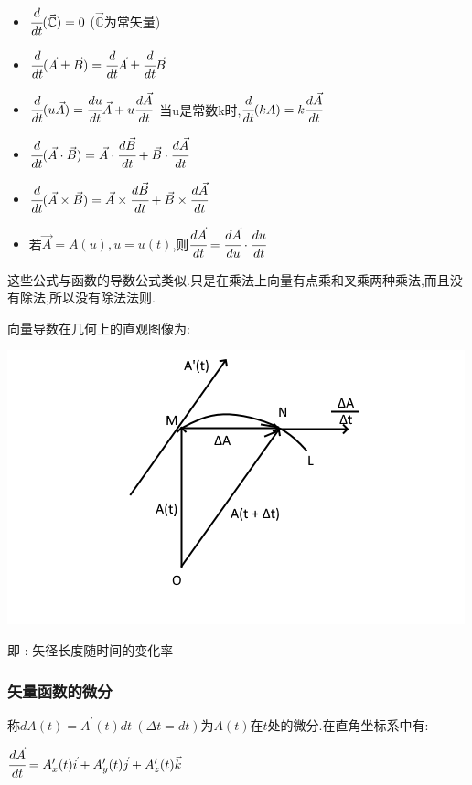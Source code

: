 \documentclass[UTF8,12pt]{ctexbook}
\newcommand{\derivative}{^\prime}
\newcommand{\mathConstant}{\mathbb{C}}
\begin{document}
{{{{{      \begin{itemize}
        \item $\cfrac{d}{dt}(\vec{\mathConstant}) = 0$ ($\vec{\mathConstant}$为常矢量)
        \item $\cfrac{d}{dt}(\vec{A} \pm \vec{B}) = \cfrac{d}{dt}\vec{A} \pm \cfrac{d}{dt}\vec{B}$
        \item $\cfrac{d}{dt}(u\vec{A}) = \cfrac{du}{dt}\vec{A} + u\cfrac{d\vec{A}}{dt}$\ 当u是常数k时,$\cfrac{d}{dt}(kA) = k\cfrac{d\vec{A}}{dt}$
        \item $\cfrac{d}{dt}(\vec{A}\cdot\vec{B}) = \vec{A}\cdot\cfrac{d\vec{B}}{dt} + \vec{B}\cdot\cfrac{d\vec{A}}{dt}$
        \item $\cfrac{d}{dt}(\vec{A}\times\vec{B}) = \vec{A}\times\cfrac{d\vec{B}}{dt} + \vec{B}\times\cfrac{d\vec{A}}{dt}$
        \item 若$\vec{A} = A(u),u = u(t)$,则$\cfrac{d\vec{A}}{dt} = \cfrac{d\vec{A}}{du}\cdot\cfrac{du}{dt}$
      \end{itemize}

      这些公式与函数的导数公式类似.只是在乘法上向量有点乘和叉乘两种乘法,而且没有除法,所以没有除法法则.

      向量导数在几何上的直观图像为:

      \includegraphics{resources/derivativeOfVectorFunction.png}

      即 : 矢径长度随时间的变化率
    }%

    \subsubsection{矢量函数的微分}{
      称$dA(t) = A\derivative(t)dt\ (\Delta t = dt)$为$A(t)$在$t$处的微分.在直角坐标系中有:

      $\cfrac{d\vec{A}}{dt} = A\derivative_x(t)\vec{i} + A\derivative_y(t)\vec{j} + A\derivative_z(t)\vec{k}$

}}}}}
\end{document}
